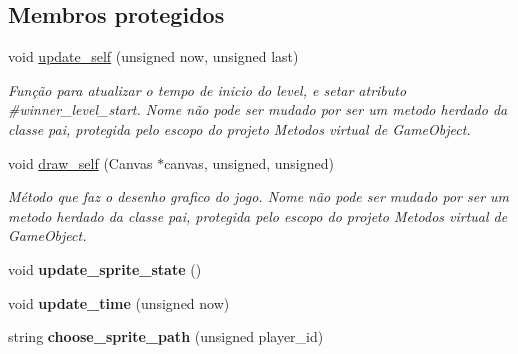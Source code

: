 \subsection*{Membros protegidos}
\begin{DoxyCompactItemize}
\item 
void \mbox{\hyperlink{classSpear_ade23821de1d6aaa031c4aa32d214a31c}{update\+\_\+self}} (unsigned now, unsigned last)
\begin{DoxyCompactList}\small\item\em Função para atualizar o tempo de inicio do level, e setar atributo \#winner\+\_\+level\+\_\+start. Nome não pode ser mudado por ser um metodo herdado da classe pai, protegida pelo escopo do projeto Metodos virtual de Game\+Object. \end{DoxyCompactList}\item 
void \mbox{\hyperlink{classSpear_ad38e92681e400061b6755e88a5a0c4e6}{draw\+\_\+self}} (Canvas $\ast$canvas, unsigned, unsigned)
\begin{DoxyCompactList}\small\item\em Método que faz o desenho grafico do jogo. Nome não pode ser mudado por ser um metodo herdado da classe pai, protegida pelo escopo do projeto Metodos virtual de Game\+Object. \end{DoxyCompactList}\item 
\mbox{\label{classSpear_ab6eeb54661a40ac51e8519e7999e76c8}} 
void {\bfseries update\+\_\+sprite\+\_\+state} ()
\item 
\mbox{\label{classSpear_a7ee5af6e650203296de28f47ff1c2601}} 
void {\bfseries update\+\_\+time} (unsigned now)
\item 
\mbox{\label{classSpear_afb12bb656cde3ea943224874f2c1f54e}} 
string {\bfseries choose\+\_\+sprite\+\_\+path} (unsigned player\+\_\+id)
\end{DoxyCompactItemize}
